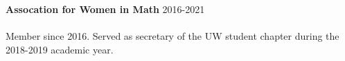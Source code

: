 \documentclass[12 pt]{article}
\newcommand{\lineunder}{\vspace*{-8pt} \\ \hspace*{-18pt} \hrulefill \\}
\newcommand{\header}[1]{{\hspace*{-15pt}\vspace*{6pt} \selectfont{\textsc{#1}}} \vspace*{-6pt} \lineunder}
\newcommand{\employer}[3]{{ \textbf{#1} \hfill #2 \\ #3\\  }}
\begin{document}
\bigskip
\employer{Assocation for Women in Math}{2016-2021}{~}
\vspace{-5mm}
Member since 2016. Served as secretary of the UW student chapter during the 2018-2019 academic year.















\end{document}
